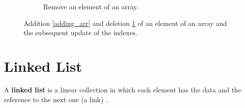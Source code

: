 \begin{figure}[H]
\begin{subfigure}[b]{\linewidth}
\caption{Remove an element of an array.}
\label{removing_arr}
\end{subfigure}
\caption[Addition \ref{adding_arr} and deletion \ref{removing_arr} of an element of an array, and the subsequent update of the indexes.]{Addition \ref{adding_arr} and deletion \ref{removing_arr} of an element of an array and the subsequent update of the indexes.}
\label{array_2}
\end{figure}

\section{Linked List}
\label{linkedlist}
A \textbf{linked list} is a linear collection in which each element has the data and the reference to the next one (a link) \cite{wikilinkedlist}. 

